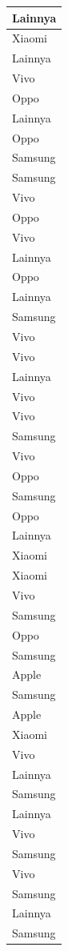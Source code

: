 \documentclass[
  letterpaper,
  DIV=11,
  numbers=noendperiod]{scrartcl}
\begin{document}
\begin{table}
\begin{tabular}[t]{l}
\hline
Lainnya\\
\hline
Xiaomi\\
\hline
Lainnya\\
\hline
Vivo\\
\hline
Oppo\\
\hline
Lainnya\\
\hline
Oppo\\
\hline
Samsung\\
\hline
Samsung\\
\hline
Vivo\\
\hline
Oppo\\
\hline
Vivo\\
\hline
Lainnya\\
\hline
Oppo\\
\hline
Lainnya\\
\hline
Samsung\\
\hline
Vivo\\
\hline
Vivo\\
\hline
Lainnya\\
\hline
Vivo\\
\hline
Vivo\\
\hline
Samsung\\
\hline
Vivo\\
\hline
Oppo\\
\hline
Samsung\\
\hline
Oppo\\
\hline
Lainnya\\
\hline
Xiaomi\\
\hline
Xiaomi\\
\hline
Vivo\\
\hline
Samsung\\
\hline
Oppo\\
\hline
Samsung\\
\hline
Apple\\
\hline
Samsung\\
\hline
Apple\\
\hline
Xiaomi\\
\hline
Vivo\\
\hline
Lainnya\\
\hline
Samsung\\
\hline
Lainnya\\
\hline
Vivo\\
\hline
Samsung\\
\hline
Vivo\\
\hline
Samsung\\
\hline
Lainnya\\
\hline
Samsung\\

\end{tabular}
\end{table}
\end{document}
